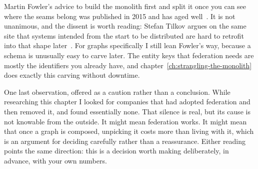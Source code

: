 Martin Fowler's advice to build the monolith first and split it once you can see
where the seams belong was published in 2015 and has aged
well~\autocite{fowler2015monolithfirst}. It is not unanimous, and the dissent is
worth reading: Stefan Tilkov argues on the same site that systems intended from
the start to be distributed are hard to retrofit into that shape
later~\autocite{tilkov2015dontstart}. For graphs specifically I still lean
Fowler's way, because a schema is unusually easy to carve later. The entity keys
that federation needs are mostly the identifiers you already have, and
chapter~\ref{ch:strangling-the-monolith} does exactly this carving without
downtime.

One last observation, offered as a caution rather than a conclusion. While
researching this chapter I looked for companies that had adopted federation and
then removed it, and found essentially none. That silence is real, but its cause
is not knowable from the outside. It might mean federation works. It might mean
that once a graph is composed, unpicking it costs more than living with it,
which is an argument for deciding carefully rather than a reassurance. Either
reading points the same direction: this is a decision worth making deliberately,
in advance, with your own numbers.
